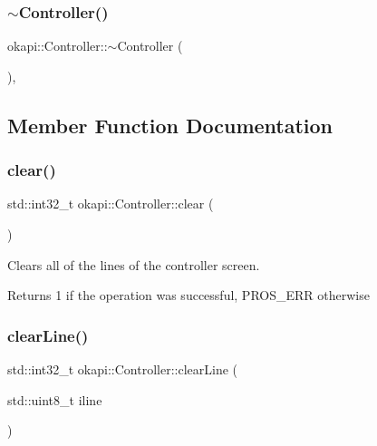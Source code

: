 \mbox{\label{classokapi_1_1Controller_ae624e3dccbefb1ff1126eaa142fd22c0}} 
\subsubsection{\texorpdfstring{$\sim$Controller()}{~Controller()}}
{\footnotesize\ttfamily okapi\+::\+Controller\+::$\sim$\+Controller (\begin{DoxyParamCaption}{ }\end{DoxyParamCaption})\hspace{0.3cm}{\ttfamily [virtual]}, {\ttfamily [default]}}



\subsection{Member Function Documentation}
\mbox{\label{classokapi_1_1Controller_a3af0986bb6287c8e24847a8c12bfcd43}} 
\subsubsection{\texorpdfstring{clear()}{clear()}}
{\footnotesize\ttfamily std\+::int32\+\_\+t okapi\+::\+Controller\+::clear (\begin{DoxyParamCaption}{ }\end{DoxyParamCaption})\hspace{0.3cm}{\ttfamily [virtual]}}

Clears all of the lines of the controller screen.

\begin{DoxyReturn}{Returns}
1 if the operation was successful, P\+R\+O\+S\+\_\+\+E\+RR otherwise 
\end{DoxyReturn}
\mbox{\label{classokapi_1_1Controller_a40e34b45b7730d4a5564e8eb8b48d345}} 
\subsubsection{\texorpdfstring{clearLine()}{clearLine()}}
{\footnotesize\ttfamily std\+::int32\+\_\+t okapi\+::\+Controller\+::clear\+Line (\begin{DoxyParamCaption}\item[{std\+::uint8\+\_\+t}]{iline }\end{DoxyParamCaption})\hspace{0.3cm}{\ttfamily [virtual]}}

